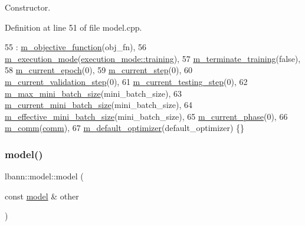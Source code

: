 Constructor. 

Definition at line 51 of file model.\+cpp.


\begin{DoxyCode}
55   : \hyperlink{classlbann_1_1model_a24c50e7108dd7698671aed7df5b22e8b}{m\_objective\_function}(obj\_fn),
56     \hyperlink{classlbann_1_1model_a2166e2aad256a335ace3bdcae5da2614}{m\_execution\_mode}(\hyperlink{base_8hpp_a2781a159088df64ed7d47cc91c4dc0a8ac185ddac8b5a8f5aa23c5b80bc12d214}{execution\_mode::training}),
57     \hyperlink{classlbann_1_1model_a639f9c3fcb81b905085f8b1932f8920f}{m\_terminate\_training}(\textcolor{keyword}{false}),
58     \hyperlink{classlbann_1_1model_a305fac94b9063e59198c7f936923221a}{m\_current\_epoch}(0),
59     \hyperlink{classlbann_1_1model_af31a76afc53061747d2170a65e98f692}{m\_current\_step}(0),
60     \hyperlink{classlbann_1_1model_af69e5f6bf49a4990fd4c18984705ab87}{m\_current\_validation\_step}(0),
61     \hyperlink{classlbann_1_1model_a2acf043862ba878cb7a91cb0d26c3791}{m\_current\_testing\_step}(0),
62     \hyperlink{classlbann_1_1model_acc496503e7cf8d635e5a31ba09b3c81a}{m\_max\_mini\_batch\_size}(mini\_batch\_size),
63     \hyperlink{classlbann_1_1model_a982cea92d230bab5a47df504f02daf98}{m\_current\_mini\_batch\_size}(mini\_batch\_size),
64     \hyperlink{classlbann_1_1model_a4887fd2816e7c51b24cb8bf8e4a80a1c}{m\_effective\_mini\_batch\_size}(mini\_batch\_size),
65     \hyperlink{classlbann_1_1model_a150ef033f81982936e007b10c421f488}{m\_current\_phase}(0),
66     \hyperlink{classlbann_1_1model_a0eabaf2b2f829fd5db3dfd26df420df0}{m\_comm}(\hyperlink{file__io_8cpp_ab048c6f9fcbcfaa57ce68b00263dbebe}{comm}),
67     \hyperlink{classlbann_1_1model_a68df9efe547f53f7bf2a03ac64527990}{m\_default\_optimizer}(default\_optimizer) \{\}
\end{DoxyCode}
\mbox{\label{classlbann_1_1model_a03fd1dc3edddb414b040bc009cf73371}} 
\subsubsection{\texorpdfstring{model()}{model()}\hspace{0.1cm}{\footnotesize\ttfamily [2/2]}}
{\footnotesize\ttfamily lbann\+::model\+::model (\begin{DoxyParamCaption}\item[{const \hyperlink{classlbann_1_1model}{model} \&}]{other }\end{DoxyParamCaption})}

